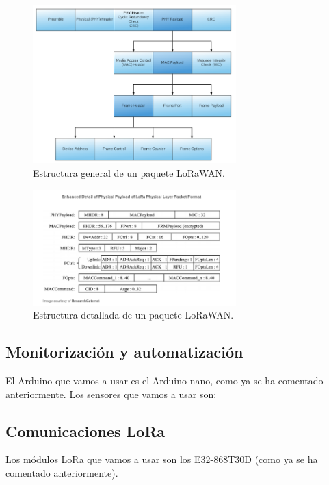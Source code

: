 \documentclass[12pt]{article}
\begin{document}
	\begin{figure}[h]
	\begin{center}
			\includegraphics[width=0.7\textwidth]{img/lora_phyLayer_packetFormat.png}
			\caption{Estructura general de un paquete LoRaWAN.}
	\end{center}
	\end{figure}
	

	
	\begin{figure}[h]
	\begin{center}
			\includegraphics[width=0.7\textwidth]{img/lora_phyLayer_packetFormat_enh.png}
			\caption{Estructura detallada de un paquete LoRaWAN.}
	\end{center}
	\end{figure}

	\pagebreak

	\subsection[Monitorización y automatización]{Monitorización y automatización}
	
	El Arduino que vamos a usar es el Arduino nano, como ya se ha comentado anteriormente. Los sensores que vamos a usar son:
	
	\pagebreak
	\subsection[Comunicaciones LoRa]{Comunicaciones LoRa}
	Los módulos LoRa que vamos a usar son los E32-868T30D (como ya se ha comentado anteriormente).
\end{document}
